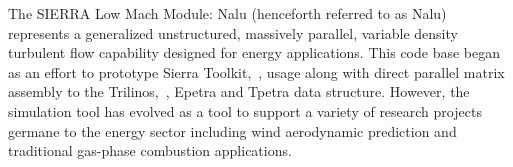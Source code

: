 The SIERRA Low Mach Module: Nalu (henceforth referred to as Nalu) represents 
a generalized unstructured, massively parallel, variable density turbulent flow 
capability designed for energy applications. This code base began as an effort 
to prototype Sierra Toolkit,~\cite{Edwards:2010}, usage along with direct parallel 
matrix assembly to the Trilinos,~\cite{Heroux:2003}, Epetra and Tpetra data structure. 
However, the simulation tool has evolved as a tool to support a variety of research 
projects germane to the energy sector including wind aerodynamic prediction and traditional 
gas-phase combustion applications. 
